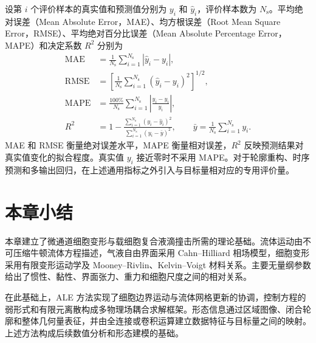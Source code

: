 设第 $i$ 个评价样本的真实值和预测值分别为 $y_i$ 和 $\widehat y_i$，评价样本数为 $N_{\mathrm s}$。平均绝对误差（Mean Absolute Error，MAE）、均方根误差（Root Mean Square Error，RMSE）、平均绝对百分比误差（Mean Absolute Percentage Error，MAPE）和决定系数 $R^2$ 分别为
\begin{align}
\mathrm{MAE}
&=
\frac{1}{N_{\mathrm s}}
\sum_{i=1}^{N_{\mathrm s}}
\left|\widehat y_i-y_i\right|,
\label{eq:ch2_mae}\\
\mathrm{RMSE}
&=
\left[
\frac{1}{N_{\mathrm s}}
\sum_{i=1}^{N_{\mathrm s}}
\left(\widehat y_i-y_i\right)^2
\right]^{1/2},
\label{eq:ch2_rmse}\\
\mathrm{MAPE}
&=
\frac{100\%}{N_{\mathrm s}}
\sum_{i=1}^{N_{\mathrm s}}
\left|
\frac{\widehat y_i-y_i}{y_i}
\right|,
\label{eq:ch2_mape}\\
R^2
&=
1-
\frac{
\sum_{i=1}^{N_{\mathrm s}}
\left(y_i-\widehat y_i\right)^2}
{
\sum_{i=1}^{N_{\mathrm s}}
\left(y_i-\bar y\right)^2},
\qquad
\bar y
=
\frac{1}{N_{\mathrm s}}
\sum_{i=1}^{N_{\mathrm s}}y_i.
\label{eq:ch2_r2}
\end{align}
MAE 和 RMSE 衡量绝对误差水平，MAPE 衡量相对误差，$R^2$ 反映预测结果对真实值变化的拟合程度。真实值 $y_i$ 接近零时不采用 MAPE。对于轮廓重构、时序预测和多输出回归，在上述通用指标之外引入与目标量相对应的专用评价量。

\section{本章小结}
\label{sec:ch2_summary}

本章建立了微通道细胞变形与载细胞复合液滴撞击所需的理论基础。流体运动由不可压缩牛顿流体方程描述，气液自由界面采用 Cahn--Hilliard 相场模型，细胞变形采用有限变形运动学及 Mooney--Rivlin、Kelvin--Voigt 材料关系。主要无量纲参数给出了惯性、黏性、界面张力、重力和细胞尺度之间的相对关系。

在此基础上，ALE 方法实现了细胞边界运动与流体网格更新的协调，控制方程的弱形式和有限元离散构成多物理场耦合求解框架。形态信息通过区域图像、闭合轮廓和整体几何量表征，并由全连接或卷积运算建立数据特征与目标量之间的映射。上述方法构成后续数值分析和形态建模的基础。
